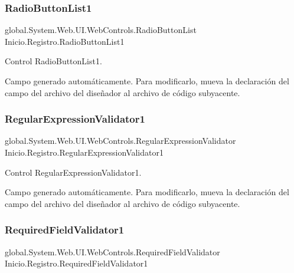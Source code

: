\subsubsection{\texorpdfstring{RadioButtonList1}{RadioButtonList1}}
{\footnotesize\ttfamily global.\+System.\+Web.\+U\+I.\+Web\+Controls.\+Radio\+Button\+List Inicio.\+Registro.\+Radio\+Button\+List1\hspace{0.3cm}{\ttfamily [protected]}}



Control Radio\+Button\+List1. 

Campo generado automáticamente. Para modificarlo, mueva la declaración del campo del archivo del diseñador al archivo de código subyacente. \mbox{\label{classInicio_1_1Registro_a1d327341db3c92117be1c5e828fe2bf9}} 
\subsubsection{\texorpdfstring{RegularExpressionValidator1}{RegularExpressionValidator1}}
{\footnotesize\ttfamily global.\+System.\+Web.\+U\+I.\+Web\+Controls.\+Regular\+Expression\+Validator Inicio.\+Registro.\+Regular\+Expression\+Validator1\hspace{0.3cm}{\ttfamily [protected]}}



Control Regular\+Expression\+Validator1. 

Campo generado automáticamente. Para modificarlo, mueva la declaración del campo del archivo del diseñador al archivo de código subyacente. \mbox{\label{classInicio_1_1Registro_af596d0fdac782957e6f85a4e5d8f3ee3}} 
\subsubsection{\texorpdfstring{RequiredFieldValidator1}{RequiredFieldValidator1}}
{\footnotesize\ttfamily global.\+System.\+Web.\+U\+I.\+Web\+Controls.\+Required\+Field\+Validator Inicio.\+Registro.\+Required\+Field\+Validator1\hspace{0.3cm}{\ttfamily [protected]}}



